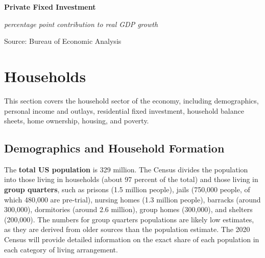 \documentclass{report}
\makeatletter
\newcommand{\tbllink}[1]{\href{https://raw.githubusercontent.com/bdecon/US-chartbook/master/chartbook/data/#1}{\faTable}}
\newcommand*\short[1]{\expandafter\@gobbletwo\number\numexpr#1\relax}
\newcommand{\sbar}[4]{
		\addplot[ybar stacked, bar width=2.6pt, draw opacity=0, fill=#1] 
			table [x=#2, y=#3, col sep=comma]{#4};}
\newcommand{\dateaxisticks}{
		date coordinates in=x, axis line style={draw=none},
		xmax={2020-10-01},
		max space between ticks=40,	    
		xtick={{1990-01-01}, {1992-01-01}, {1994-01-01}, 
			{1996-01-01}, {1998-01-01}, {2000-01-01}, 
			{2002-01-01}, {2004-01-01}, {2006-01-01},
			{2008-01-01}, {2010-01-01}, {2012-01-01}, {2014-01-01},
		    {2016-01-01}, {2018-01-01}, {2020-01-01}},
		minor xtick={{1989-01-01}, {1991-01-01}, {1993-01-01},
			{1995-01-01}, {1997-01-01}, {1999-01-01}, 
			{2001-01-01}, {2003-01-01}, {2005-01-01}, {2007-01-01},
		    {2009-01-01}, {2011-01-01}, {2013-01-01}, {2015-01-01},
		    {2017-01-01}, {2019-01-01}},
		enlarge y limits={0.06}, enlarge x limits={0.01},
		}
\newcommand{\bbar}[2]{extra #1 ticks = {{#2}}, extra #1 tick labels = ,
		extra #1 tick style = {grid=major, grid style={thick, black!25}},}
\newcommand{\rbars}{
		\fill[color=black!10] (axis cs:{1990-07-01},\pgfkeysvalueof{/pgfplots/ymin}) rectangle 
			(axis cs:{1991-03-01}, \pgfkeysvalueof{/pgfplots/ymax});
		\fill[color=black!10] (axis cs:{2007-12-01},\pgfkeysvalueof{/pgfplots/ymin}) rectangle 
			(axis cs:{2009-07-01}, \pgfkeysvalueof{/pgfplots/ymax});
		\fill[color=black!10] (axis cs:{2001-03-01},\pgfkeysvalueof{/pgfplots/ymin}) rectangle 
			(axis cs:{2001-11-01}, \pgfkeysvalueof{/pgfplots/ymax});
		\fill[color=black!10] (axis cs:{2020-02-01},\pgfkeysvalueof{/pgfplots/ymin}) rectangle 
			(axis cs:{2020-10-01}, \pgfkeysvalueof{/pgfplots/ymax});}
\makeatother
\begin{document}
{{{\begin{minipage}{0.76\textwidth}
 

\vspace{5mm} 

\normalsize \textbf{Private Fixed Investment}

\footnotesize{\textit{percentage point contribution to real GDP growth}}

\hspace*{-3mm} 

\footnotesize{Source: Bureau of Economic Analysis} \hfill \tbllink{inv.csv} 
\end{minipage}

\newpage
\section*{\color{darkgray}\LARGE Households}
\label{sec:hh}

\begin{minipage}{0.76\textwidth}
\small This section covers the household sector of the economy, including demographics, personal income and outlays, residential fixed investment, household balance sheets, home ownership, housing, and poverty.

\subsection*{\color{black!70} \seriffont Demographics and Household Formation}

The \textbf{total US population} is 329 million. The Census divides the population into those living in households (about 97 percent of the total) and those living in \textbf{group quarters}, such as prisons (1.5 million people), jails (750,000 people, of which 480,000 are pre-trial), nursing homes (1.3 million people), barracks (around 300,000), dormitories (around 2.6 million), group homes (300,000), and shelters (200,000). The numbers for group quarters populations are likely low estimates, as they are derived from older sources than the population estimate. The 2020 Census will provide detailed information on the exact share of each population in each category of living arrangement.\\ 


\end{minipage}}}}
\end{document}
